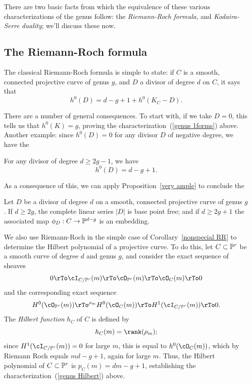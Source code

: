 There are two basic facts from which the equivalence of these various characterizations of the genus follow: the \emph{Riemann-Roch formula}, and \emph{Kodaira-Serre duality}; we'll discuss these now.

\subsection{The Riemann-Roch formula}

The classical Riemann-Roch formula is simple to state: if $C$ is a smooth, connected projective curve of genus $g$, and $D$ a divisor of degree $d$ on $C$, it says that
$$
h^0(D) = d - g + 1 + h^0(K_C - D).
$$

There are a number of general consequences. To start with, if we take $D=0$, this tells us that $h^0(K) = g$, proving the characterization~(\ref{genus 1forms}) above. Another example: since $h^0(D) = 0$ for any divisor $D$ of negative degree, we have the

\begin{corollary}\label{nonspecial RR}
For any divisor of degree $d \geq 2g-1$, we have
$$
h^0(D) = d - g + 1.
$$
\end{corollary}


As a consequence of this, we can apply Proposition~\ref{very ample} to conclude the

\begin{corollary}\label{degree 2g+1 embedding}
Let $D$ be a divisor of degree $d$ on a smooth, connected projective curve of genus $g$. If $d \geq 2g$, the complete linear series $|D|$ is base point free; and if $d \geq 2g+1$ the associated map $\phi_D : C \to \PP^{d-g}$ is an embedding.
\end{corollary}

We also use Riemann-Roch in the simple case of Corollary~\ref{nonspecial RR} to determine the Hilbert polynomial of a projective curve. To do this, let $C \subset \PP^r$ be a smooth curve of degree $d$ and genus $g$, and consider the exact sequence of sheaves
$$
0 \rTo \cI_{C/\PP^r}(m) \rTo \cO_{\PP^r}(m) \rTo \cO_C(m) \rTo 0
$$
and the corresponding exact sequence
$$
 H^0(\cO_{\PP^r}(m)) \rTo^{\rho_m} H^0(\cO_C(m)) \rTo H^1(\cI_{C/\PP^r}(m)) \rTo 0.
$$
The \emph{Hilbert function} $h_C$ of $C$  is defined by
$$
h_C(m) = \rank(\rho_m);
$$
 since $H^1(\cI_{C/\PP^r}(m)) = 0$ for large $m$, this is equal to $h^0(\cO_C(m))$, which by Riemann Roch equals $md-g+1$, again for large $m$. Thus, the Hilbert polynomial of $C \subset \PP^r$ is $p_C(m) = dm-g+1$, establishing the characterization~(\ref{genus Hilbert}) above.
 
